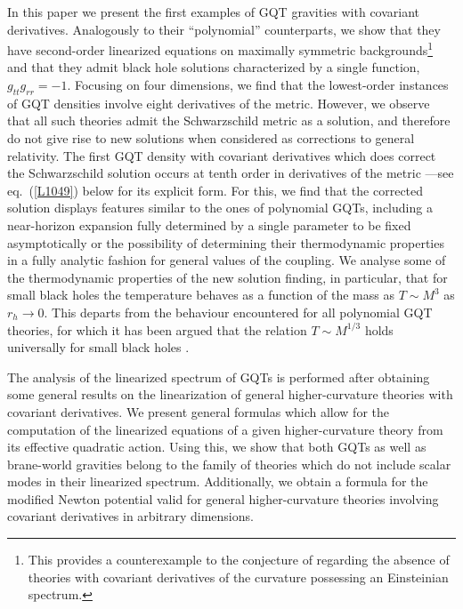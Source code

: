 \documentclass[11pt]{article}
\newcommand{\req}[1]{(\ref{#1})} %
\renewcommand{\req}[1]{eq.~(\ref{#1})}
\newcommand{\comment}[1]{{\bf [[[#1]]]}}
\begin{document}
In this paper we present the first examples of GQT gravities with covariant derivatives. Analogously to their ``polynomial'' counterparts, we show that they have second-order linearized equations on maximally symmetric backgrounds\footnote{This provides a counterexample to the conjecture of \cite{Edelstein:2022lco} regarding the absence of theories with covariant derivatives of the curvature possessing an Einsteinian spectrum.} and that they admit black hole solutions characterized by a single function, $g_{tt} g_{rr}=-1$. Focusing on four dimensions, we find that the lowest-order instances of  GQT densities involve eight derivatives of the metric. However, we observe that all such theories admit the Schwarzschild metric as a solution, and therefore do not give rise to new solutions when considered as corrections to general relativity. The first GQT density with covariant derivatives which does correct the Schwarzschild solution occurs at tenth order in derivatives of the metric ---see \req{L1049} below for its explicit form. For this, we find that the corrected solution displays features similar to the ones of polynomial GQTs, including a near-horizon expansion fully determined by a single parameter to be fixed asymptotically or the possibility of determining their thermodynamic properties in a fully analytic fashion for general values of the coupling. We analyse some of the thermodynamic properties of the new solution finding, in particular, that for small black holes the temperature behaves as a function of the mass as $T \sim M^{3}$ as $r_h \to 0$. This departs from the behaviour encountered for all polynomial GQT theories, for which it has been argued that the relation $T \sim M^{1/3}$ holds universally for small black holes \cite{PabloPablo4, Bueno:2019ycr}. 

The analysis of the linearized spectrum of GQTs is performed after obtaining some general results on the linearization of general higher-curvature theories with covariant derivatives. We present general formulas which allow for the computation of the linearized equations of a given higher-curvature theory from its effective quadratic action. Using this, we show that both GQTs as well as brane-world gravities belong to the family of theories which do not include scalar modes in their linearized spectrum. Additionally, we obtain a formula for the modified Newton potential valid for general higher-curvature theories involving covariant derivatives in arbitrary dimensions.

\end{document}
